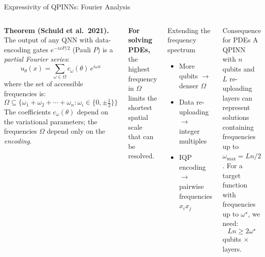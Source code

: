 \documentclass[aspectratio=169,10pt]{beamer}
\begin{document}
\begin{frame}{Expressivity of QPINNs: Fourier Analysis}
  \begin{columns}[T]
      \textbf{Theorem (Schuld et al.\ 2021).}
      The output of any QNN with data-encoding gates
      $e^{-ixP/2}$ (Pauli $P$) is a \emph{partial Fourier series}:
      \[
        u_\theta(x) = \sum_{\omega\in\Omega}
          c_\omega(\theta)\,e^{i\omega x}
      \]
      where the set of accessible frequencies is:
      \[
        \Omega \subseteq \bigl\{
          \omega_1 + \omega_2 + \cdots + \omega_n
          : \omega_i\in\{0,\pm\tfrac{1}{2}\}
        \bigr\}
      \]
      The coefficients $c_\omega(\theta)$ depend on the
      variational parameters; the frequencies $\Omega$
      depend only on the \emph{encoding}.

      \textbf{For solving PDEs,} the highest frequency
      in $\Omega$ limits the shortest spatial scale
      that can be resolved.
      \begin{block}{Extending the frequency spectrum}
        \begin{itemize}
          \item More qubits $\to$ denser $\Omega$
          \item Data re-uploading $\to$ integer multiples
          \item IQP encoding $\to$ pairwise frequencies
                $x_ix_j$
        \end{itemize}
      \end{block}
      \vspace{0.2cm}
      \begin{alertblock}{Consequence for PDEs}
        A QPINN with $n$ qubits and $L$ re-uploading layers
        can represent solutions containing frequencies up
        to $\omega_{\max} = Ln/2$.
        For a target function with frequencies up to
        $\omega^\star$, we need:
        \[
          Ln \geq 2\omega^\star
        \]
        qubits $\times$ layers.
      \end{alertblock}
  \end{columns}
\end{frame}
\end{document}
